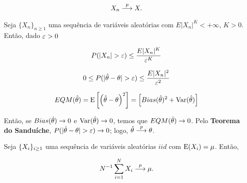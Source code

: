 \documentclass[11pt, oneside, a4paper, article]{article}
\numberwithin{equation}{section}
\begin{document}
\begin{description}
\begin{description}
\begin{defn}
\vspace{-1 em}
\begin{align*}
	X_{n}  \overset{p}{\longrightarrow}  X.
\end{align*}
\end{defn}

\begin{defn}
Seja
$\{ X_{n} \}_{n \geq 1}$ 
uma sequência de variáveis aleatórias com
$E|X_{n}|^{K} < +\infty$, $K>0$. 
Então, dado $\varepsilon >0$

\vspace{-1 em}
\begin{align*}
	P(| X_{n} | > \varepsilon ) \leq \frac{E|X_{n}|^{K}}{\varepsilon^{K}}
\end{align*}
\end{defn}

\begin{defn} %
\begin{align*}
0 \leq P(| \hat{\theta} - \theta | > \varepsilon ) \leq \frac{E|X_{n}|^{2}}{\varepsilon^{2}}
\end{align*}
\end{defn}

\begin{defn}
\begin{align*}
EQM(\hat{\theta}) 
=
\text{E}\left[ \left( \hat{\theta} - \theta \right)^2 \right] 
=
\left[ Bias(\hat{\theta})^{2} + \text{Var}(\hat{\theta}) \right]
\end{align*}
\end{defn}

Então, se $Bias(\hat{\theta}) \to 0$ e $\text{Var}(\hat{\theta}) \to 0$, temos que $EQM(\hat{\theta}) \to 0$.
Pelo \textbf{Teorema do Sanduíche}, $P(|\hat{\theta} - \theta| > \varepsilon) \to 0$; logo, $\hat{\theta}  \overset{p}{\longrightarrow}  \theta$.

\begin{defn} \label{def:lgn}
Seja $\{X_{i}\}_{i \geq 1}$ uma sequência de variáveis aleatórias $iid$ com $\text{E}(X_{i}) = \mu$.
Então, 

\vspace{-1 em}
\begin{align*}
	N^{-1} \sum_{i=1}^{N} X_{i}  \overset{p}{\longrightarrow}  \mu.
\end{align*}
\end{defn}


\end{description}
\end{description}
\end{document}
